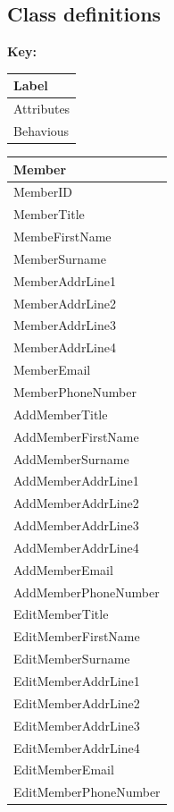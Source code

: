 \subsection{Class definitions} 

\begin{flushleft}
\textbf{Key:}
\begin{tabular}{|p{4cm}|}
	\hline
	Label \\ \hline
	Attributes \\ \hline	
	Behavious \\ \hline
\end{tabular}


\end{flushleft}

\begin{tabular}{|p{4cm}|}
	\hline
	\textbf{Member} \\ \hline
	MemberID \\
	MemberTitle \\
	MembeFirstName \\
	MemberSurname \\
	MemberAddrLine1 \\
	MemberAddrLine2 \\
	MemberAddrLine3 \\
	MemberAddrLine4 \\
	MemberEmail \\
	MemberPhoneNumber \\ \hline	
		AddMemberTitle \\
		AddMemberFirstName \\
		AddMemberSurname \\
		AddMemberAddrLine1 \\
		AddMemberAddrLine2 \\
		AddMemberAddrLine3 \\
		AddMemberAddrLine4 \\
		AddMemberEmail \\
		AddMemberPhoneNumber \\ 
		EditMemberTitle \\
		EditMemberFirstName \\
		EditMemberSurname \\
		EditMemberAddrLine1 \\
		EditMemberAddrLine2 \\
		EditMemberAddrLine3 \\
		EditMemberAddrLine4 \\
		EditMemberEmail \\
		EditMemberPhoneNumber \\ \hline
\end{tabular}

